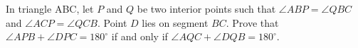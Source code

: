 In triangle ABC, let $P$ and $Q$ be two interior points such that $\angle ABP = \angle QBC$ and $\angle ACP = \angle QCB$. Point $D$ lies on segment $BC$. Prove that $\angle APB + \angle DPC = 180^\circ$ if and only if $\angle AQC + \angle DQB = 180^\circ$.